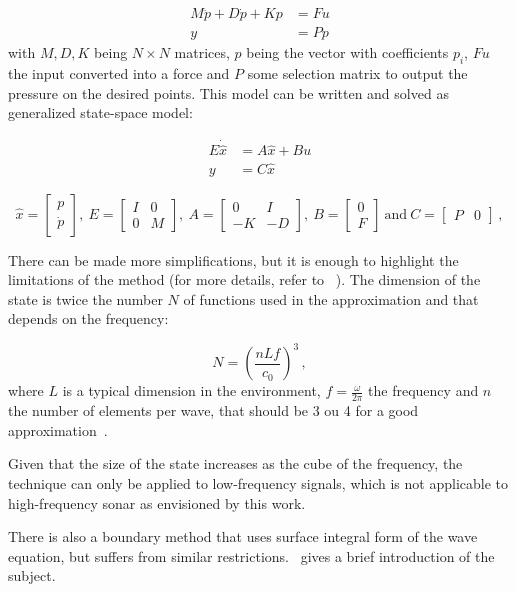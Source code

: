 \begin{align*}
M\ddot{p} + D\dot{p} + Kp &= Fu \\
y &= Pp
\end{align*}
%
with \(M,D,K\) being \(N \times N \) matrices, $p$ being the vector with
coefficients $p_i$, $Fu$ the input converted into a force and $P$ some selection
matrix to output the pressure on the desired points. This model can be written
and solved as generalized state-space model:

\begin{align*}
E\dot{\hat{x}} &= A\hat{x} + Bu \\
y &= C\hat{x}
\end{align*}

\[
\hat{x} =
  \begin{bmatrix}
    p \\
    \dot{p}
  \end{bmatrix},~
E =
  \begin{bmatrix}
    I & 0 \\
    0 & M
  \end{bmatrix},~
A =
  \begin{bmatrix}
    0 & I \\
    -K & -D
  \end{bmatrix},~
B =
  \begin{bmatrix}
    0 \\
    F
  \end{bmatrix}
  ~
  \text{and}
  ~
C =
  \begin{bmatrix}
    P & 0 
  \end{bmatrix}\,,
\]
 
 There can be made more simplifications, but it is enough to highlight the
 limitations of the method (for more details, refer to
~\citet{deines2006comparative}). The dimension of the state is twice
 the number $N$ of functions used in the approximation and that depends on the
 frequency:
 
 \[N = \left(\frac{nLf}{c_0}\right)^3\,, \]
 where $L$ is a typical dimension in the environment, $f = \frac{\omega}{2\pi}$
 the frequency and $n$ the number of elements per wave, that should be 3 ou 4
 for a good approximation~\cite{deines2006comparative}.
 
 Given that the size of the state increases as the cube of the frequency, the
 technique can only be applied to low-frequency signals, which is not applicable
 to high-frequency sonar as envisioned by this work. 

There is also a boundary method that uses surface integral form of the wave
equation, but suffers from similar restrictions.~\citet{funkhouser2003survey}
gives a brief introduction of the subject.

